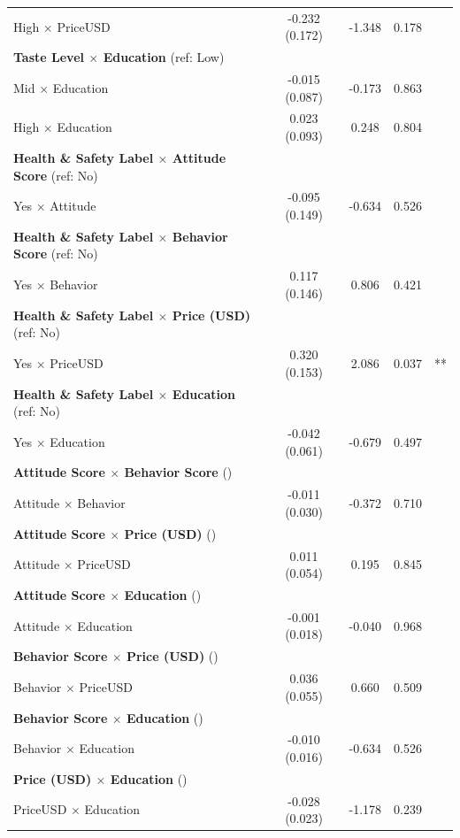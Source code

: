 \begin{center}
\begin{longtable}{lcccc}
\qquad High $\times$ PriceUSD & -0.232 (0.172) & -1.348 & 0.178 &  \\
\quad \textbf{Taste Level $\times$ Education} (ref: Low) & & & & \\
\qquad Mid $\times$ Education & -0.015 (0.087) & -0.173 & 0.863 &  \\
\qquad High $\times$ Education & 0.023 (0.093) & 0.248 & 0.804 &  \\
\quad \textbf{Health \& Safety Label $\times$ Attitude Score} (ref: No) & & & & \\
\qquad Yes $\times$ Attitude & -0.095 (0.149) & -0.634 & 0.526 &  \\
\quad \textbf{Health \& Safety Label $\times$ Behavior Score} (ref: No) & & & & \\
\qquad Yes $\times$ Behavior & 0.117 (0.146) & 0.806 & 0.421 &  \\
\quad \textbf{Health \& Safety Label $\times$ Price (USD)} (ref: No) & & & & \\
\qquad Yes $\times$ PriceUSD & 0.320 (0.153) & 2.086 & 0.037 & ** \\
\quad \textbf{Health \& Safety Label $\times$ Education} (ref: No) & & & & \\
\qquad Yes $\times$ Education & -0.042 (0.061) & -0.679 & 0.497 &  \\
\quad \textbf{Attitude Score $\times$ Behavior Score} () & & & & \\
\qquad Attitude $\times$ Behavior & -0.011 (0.030) & -0.372 & 0.710 &  \\
\quad \textbf{Attitude Score $\times$ Price (USD)} () & & & & \\
\qquad Attitude $\times$ PriceUSD & 0.011 (0.054) & 0.195 & 0.845 &  \\
\quad \textbf{Attitude Score $\times$ Education} () & & & & \\
\qquad Attitude $\times$ Education & -0.001 (0.018) & -0.040 & 0.968 &  \\
\quad \textbf{Behavior Score $\times$ Price (USD)} () & & & & \\
\qquad Behavior $\times$ PriceUSD & 0.036 (0.055) & 0.660 & 0.509 &  \\
\quad \textbf{Behavior Score $\times$ Education} () & & & & \\
\qquad Behavior $\times$ Education & -0.010 (0.016) & -0.634 & 0.526 &  \\
\quad \textbf{Price (USD) $\times$ Education} () & & & & \\
\qquad PriceUSD $\times$ Education & -0.028 (0.023) & -1.178 & 0.239 &  \\
\end{longtable}
\end{center}